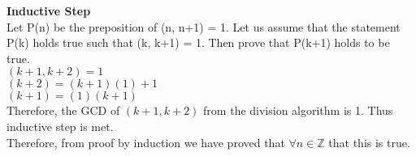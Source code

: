 \documentclass[12pt]{article}
\begin{document}
\begin{enumerate}
    \textbf{Inductive Step} \\
    Let P(n) be the preposition of (n, n+1) = 1. Let us assume that the statement P(k) holds true such that (k, k+1) = 1. Then prove that P(k+1) holds to be true.  \\
    $(k+1, k+2) = 1$ \\
    $(k+2) = (k+1)(1) + 1$ \\
    $(k+1) = (1)(k+1)$ \\
    Therefore, the GCD of $(k+1, k+2)$ from the division algorithm is 1. Thus inductive step is met. \\
    Therefore, from proof by induction we have proved that $\forall n \in \mathbb{Z}$ that this is true. 
\end{enumerate}
\end{document}
